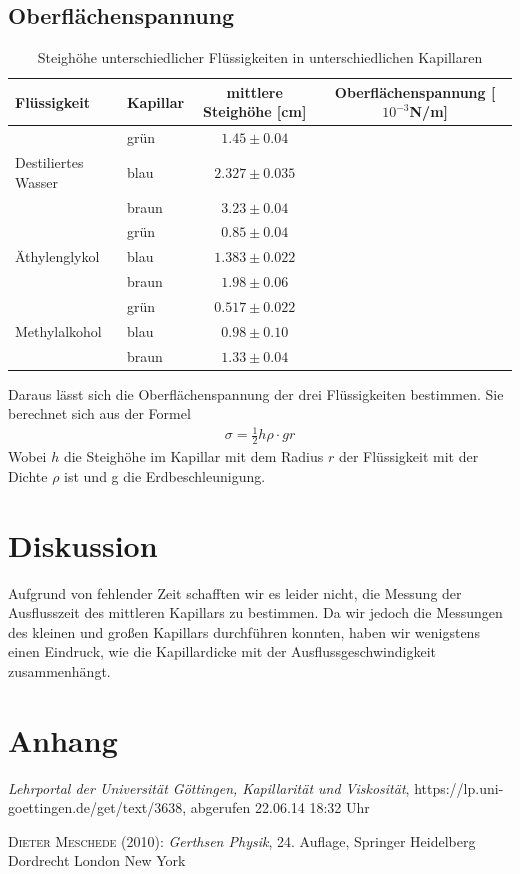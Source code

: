 \documentclass[12pt,a4paper,titlepage,headinclude,bibtotoc]{scrartcl}
\begin{document}
\subsection{Oberflächenspannung}
\begin{table}[!h]
\centering
\begin{tabular}{|l|l|c|c|}
\hline
Flüssigkeit 		&Kapillar & mittlere Steighöhe [cm]	& Oberflächenspannung [$10^{-3}$N/m]\\\hline\hline
			&grün	& $1.45\pm 0.04$		&\\
Destiliertes Wasser	&blau	& $2.327\pm 0.035$		&\\
                        &braun  & $3.23\pm 0.04$		&\\
\hline
			&grün	& $0.85\pm 0.04$		&\\
Äthylenglykol		&blau	& $1.383\pm 0.022$		&\\
			&braun	& $1.98\pm 0.06$		&\\
\hline
			&grün	& $0.517\pm 0.022$		&\\
Methylalkohol		&blau	& $0.98\pm 0.10$		&\\
			&braun	& $1.33\pm 0.04$		&\\
\hline
\end{tabular}
\caption{Steighöhe unterschiedlicher Flüssigkeiten in unterschiedlichen Kapillaren}
\end{table}
Daraus lässt sich die Oberflächenspannung der drei Flüssigkeiten bestimmen.
Sie berechnet sich aus der Formel
\begin{align}
\sigma=\frac{1}{2}h\rho\cdot g r
\end{align} 
Wobei $h$ die Steighöhe im Kapillar mit dem Radius $r$ der Flüssigkeit mit der Dichte $\rho$ ist und g die Erdbeschleunigung.
\section{Diskussion}
\label{sec:diskussion}
Aufgrund von fehlender Zeit schafften wir es leider nicht, die Messung der Ausflusszeit des mittleren Kapillars zu bestimmen.
Da wir jedoch die Messungen des kleinen und großen Kapillars durchführen konnten, haben wir wenigstens einen Eindruck, wie die Kapillardicke mit der Ausflussgeschwindigkeit zusammenhängt.

\section{Anhang}
\begin{thebibliography}{9}

	\emph{Lehrportal der Universität Göttingen, Kapillarität und Viskosität},
  https://lp.uni-goettingen.de/get/text/3638, abgerufen 22.06.14 18:32 Uhr

	\textsc{Dieter Meschede} (2010): \emph{Gerthsen Physik}, 24. Auflage, Springer Heidelberg
Dordrecht London New York

\end{thebibliography}
\end{document}

